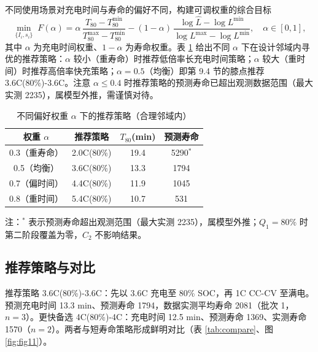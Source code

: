 \documentclass[withoutpreface]{cumcmthesis}
\begin{document}
不同使用场景对充电时间与寿命的偏好不同，构建可调权重的综合目标
\begin{equation}\label{eq:obj}
\min_{\{I_i,s_i\}}\; F(\alpha)=\alpha\,\frac{T_{80}-T_{80}^{\min}}{T_{80}^{\max}-T_{80}^{\min}}-(1-\alpha)\,\frac{\log\hat{L}-\log L^{\min}}{\log L^{\max}-\log L^{\min}},\quad \alpha\in[0,1],
\end{equation}
其中 $\alpha$ 为充电时间权重、$1-\alpha$ 为寿命权重。表 \ref{tab:weight} 给出不同 $\alpha$ 下在设计邻域内寻优的推荐策略：$\alpha$ 较小（重寿命）时推荐低倍率长充电时间策略；$\alpha$ 较大（重时间）时推荐高倍率快充策略；$\alpha=0.5$（均衡）即第 9.4 节的膝点推荐 3.6C(80\%)-3.6C。注意 $\alpha\le0.4$ 时推荐策略的预测寿命已超出观测数据范围（最大实测 2235），属模型外推，需谨慎对待。

\begin{table}[htbp]
\centering
\caption{不同偏好权重 $\alpha$ 下的推荐策略（合理邻域内）}
\label{tab:weight}
\begin{tabular}{cccc}
\toprule
权重 $\alpha$ & 推荐策略 & $T_{80}$(min) & 预测寿命 \\
\midrule
0.3（重寿命） & 2.0C(80\%) & 19.4 & 5290$^{*}$ \\
0.5（均衡） & 3.6C(80\%) & 13.3 & 1794 \\
0.7（偏时间） & 4.4C(80\%) & 11.9 & 1045 \\
0.8（重时间） & 5.4C(80\%) & 10.7 & 531 \\
\bottomrule
\end{tabular}
\end{table}
注：$^{*}$ 表示预测寿命超出观测范围（最大实测 2235），属模型外推；$Q_1=80\%$ 时第二阶段覆盖为零，$C_2$ 不影响结果。

\subsection{推荐策略与对比}

推荐策略 3.6C(80\%)-3.6C：先以 3.6C 充电至 80\% SOC，再 1C CC-CV 至满电。预测充电时间 13.3 min、预测寿命 1794，数据实测平均寿命 2081（批次 1，$n=3$）。更快备选 4C(80\%)-4C：充电时间 12.5 min、预测寿命 1369、实测寿命 1570（$n=2$）。两者与短寿命策略形成鲜明对比（表 \ref{tab:compare}、图 \ref{fig:fig11}）。
\end{document}
